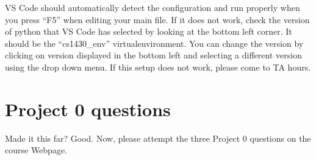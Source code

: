 \documentclass{article}
\begin{document}
VS Code should automatically detect the configuration and run properly when you press ``F5'' when editing your main file. If it does not work, check the version of python that VS Code has selected by looking at the bottom left corner. It should be the ``cs1430\_env'' virtualenvironment. You can change the version by clicking on version displayed in the bottom left and selecting a different version using the drop down menu. If this setup does not work, please come to TA hours.

\section{Project 0 questions}
Made it this far? Good. Now, please attempt the three Project 0 questions on the course Webpage.
\end{document}
